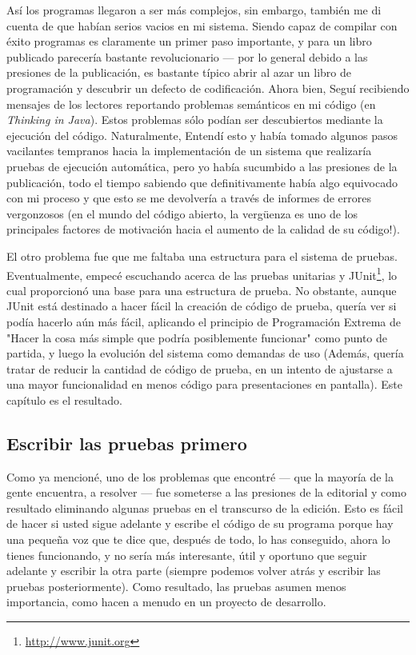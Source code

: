 Así los programas llegaron a ser más complejos, sin embargo, también me di cuenta de que habían serios vacios en mi sistema. Siendo capaz de compilar con éxito programas es claramente un primer paso importante, y para un libro publicado parecería bastante revolucionario — por lo general debido a las presiones de la publicación, es bastante típico abrir al azar un libro de programación y descubrir un defecto de codificación. Ahora bien, Seguí recibiendo mensajes de los lectores reportando problemas semánticos en mi código (en \textit{Thinking in Java}). Estos problemas sólo podían ser descubiertos mediante la ejecución del código. Naturalmente, Entendí esto y había tomado algunos pasos vacilantes tempranos hacia la implementación de un sistema que realizaría pruebas de ejecución automática, pero yo había sucumbido a las presiones de la publicación, todo el tiempo sabiendo que definitivamente había algo equivocado con mi proceso y que esto se me devolvería a través de informes de errores vergonzosos (en el mundo del código abierto, la vergüenza es uno de los principales factores de motivación hacia el aumento de la calidad de su código!).         \newline

El otro problema fue que me faltaba una estructura para el sistema de pruebas. Eventualmente, empecé escuchando acerca de las pruebas unitarias y JUnit\footnote{\url{http://www.junit.org}}, lo cual proporcionó una base para una estructura de prueba. No obstante, aunque JUnit está destinado a hacer fácil la creación de código de prueba, quería ver si podía hacerlo aún más fácil, aplicando el principio de Programación Extrema de "Hacer la cosa más simple que podría posiblemente funcionar" como punto de partida, y luego la evolución del sistema como demandas de uso (Además, quería tratar de reducir la cantidad de código de prueba, en un intento de ajustarse a una mayor funcionalidad en menos código para presentaciones en pantalla). Este capítulo es el resultado.

\subsection*{Escribir las pruebas primero}
\label{subsec:elpp}

Como ya mencioné, uno de los problemas que encontré — que la mayoría de la gente encuentra, a resolver —  fue someterse a las presiones de la editorial y como resultado eliminando algunas pruebas en el transcurso de la edición. Esto es fácil de hacer si usted sigue adelante y escribe el código de su programa porque hay una pequeña voz que te dice que, después de todo, lo has conseguido, ahora lo tienes funcionando, y no sería más interesante, útil y oportuno que seguir adelante y escribir la otra parte (siempre podemos volver atrás y escribir las pruebas posteriormente). Como resultado, las pruebas asumen menos importancia, como hacen a menudo en un proyecto de desarrollo.  \newline

